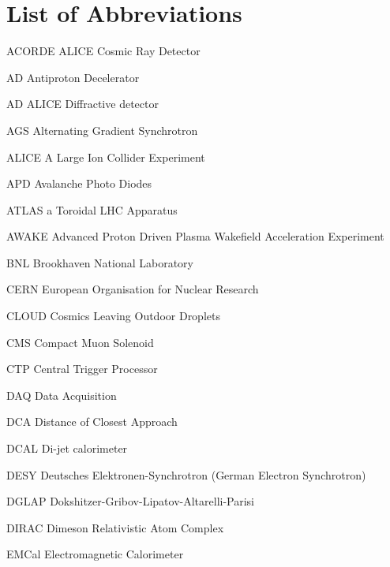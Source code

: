 
 
 
\chapter*{List of Abbreviations}
 \label{app:symbols}

\begin{abbrv}
 
\item[ACORDE]			ALICE Cosmic Ray Detector
\item[AD]				Antiproton Decelerator 
\item[AD]				ALICE Diffractive detector
\item[AGS]			Alternating Gradient Synchrotron
\item[ALICE]			A Large Ion Collider Experiment 
\item[APD]			Avalanche Photo Diodes
\item[ATLAS]			a Toroidal LHC Apparatus 
\item[AWAKE] 			Advanced Proton Driven Plasma Wakefield Acceleration Experiment
 
\item[BNL]				Brookhaven National Laboratory 
 
\item[CERN]			European Organisation for Nuclear Research 
\item[CLOUD]			Cosmics Leaving Outdoor Droplets
 \item[CMS]			Compact Muon Solenoid
 \item[CTP]			Central Trigger Processor

\item[DAQ]			Data Acquisition 
\item[DCA]			Distance of Closest Approach
\item[DCAL]			Di-jet calorimeter
\item[DESY] 			Deutsches Elektronen-Synchrotron (German Electron Synchrotron)
 \item[DGLAP]			Dokshitzer-Gribov-Lipatov-Altarelli-Parisi
\item[DIRAC]			Dimeson Relativistic Atom Complex

\item[EMCal]			Electromagnetic Calorimeter


\end{abbrv}

